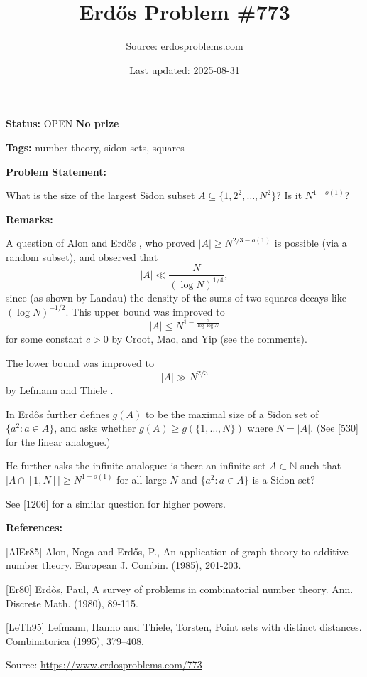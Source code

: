 \documentclass{article}
\title{Erd\H{o}s Problem \#773}
\date{Last updated: 2025-08-31}
\author{Source: erdosproblems.com}
\begin{document}
\maketitle

\noindent\textbf{Status:} OPEN \quad \textbf{No prize}

\noindent\textbf{Tags:} number theory, sidon sets, squares

\medskip
\noindent\textbf{Problem Statement:}

What is the size of the largest Sidon subset $A\subseteq\{1,2^2,\ldots,N^2\}$? Is it $N^{1-o(1)}$?

\bigskip
\noindent\textbf{Remarks:}

A question of Alon and Erd\H{o}s \cite{AlEr85}, who proved $\lvert A\rvert \geq N^{2/3-o(1)}$ is possible (via a random subset), and observed that\[\lvert A\rvert \ll \frac{N}{(\log N)^{1/4}},\]since (as shown by Landau) the density of the sums of two squares decays like $(\log N)^{-1/2}$. This upper bound was improved to\[\lvert A\rvert \leq N^{1-\frac{c}{\log\log N}}\]for some constant $c>0$ by Croot, Mao, and Yip (see the comments).

The lower bound was improved to\[\lvert A\rvert \gg N^{2/3}\]by Lefmann and Thiele \cite{LeTh95}.

In \cite{Er80} Erd\H{o}s further defines $g(A)$ to be the maximal size of a Sidon set of $\{a^2 : a\in A\}$, and asks whether $g(A)\geq g(\{1,\ldots,N\})$ where $N=\lvert A\rvert$. (See [530] for the linear analogue.)

He further asks the infinite analogue: is there an infinite set $A\subset \mathbb{N}$ such that $\lvert A\cap [1,N]\rvert \geq N^{1-o(1)}$ for all large $N$ and $\{a^2 : a \in A\}$ is a Sidon set?

See [1206] for a similar question for higher powers.

\bigskip
\noindent\textbf{References:}

[AlEr85] Alon, Noga and Erd\H{o}s, P., An application of graph theory to additive number theory. European J. Combin. (1985), 201-203.
 
 [Er80] Erd\H{o}s, Paul, A survey of problems in combinatorial number theory. Ann. Discrete Math. (1980), 89-115.
 
 [LeTh95] Lefmann, Hanno and Thiele, Torsten, Point sets with distinct distances. Combinatorica (1995), 379--408.

\bigskip
\noindent\small{Source: \url{https://www.erdosproblems.com/773}}
\end{document}
